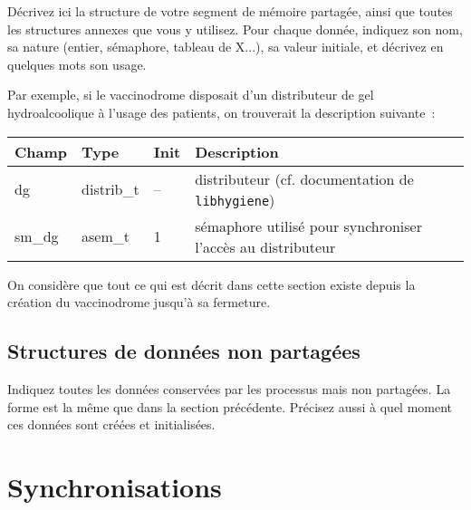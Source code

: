 \documentclass[a4paper]{article}
\makeatletter
\newenvironment{expl}{%
  \begin{list}{}{%
      \small\itshape%
      \topsep\z@%
      \listparindent0pt%
      \parsep0.75\baselineskip%
      \setlength{\leftmargin}{20mm}%
      \setlength{\rightmargin}{20mm}%
    }
  \item[]}%
  {\end{list}}
\makeatother
\begin{document}
\begin{expl}
  Décrivez ici la structure de votre segment de mémoire partagée,
  ainsi que toutes les structures annexes que vous y utilisez. Pour
  chaque donnée, indiquez son nom, sa nature (entier, sémaphore,
  tableau de X...), sa valeur initiale, et décrivez en quelques
  mots son usage.

  Par exemple, si le vaccinodrome disposait d'un distributeur de gel
  hydroalcoolique à l'usage des patients, on trouverait la description
  suivante~:

  \begin{tabularx}{\linewidth}{|l|l|l|X|}
    \hline
    Champ & Type & Init & Description \\ \hline%
    dg & distrib\_t & -- & distributeur (cf. documentation de
    \texttt{libhygiene}) \\ \hline%
    sm\_dg & asem\_t & 1 & sémaphore utilisé pour synchroniser l'accès
    au distributeur \\ \hline%
  \end{tabularx}

  On considère que tout ce qui est décrit dans cette section existe
  depuis la création du vaccinodrome jusqu'à sa fermeture.
\end{expl}

\subsection{Structures de données non partagées}

\begin{expl}
  Indiquez toutes les données conservées par les processus mais non
  partagées. La forme est la même que dans la section précédente.
  Précisez aussi à quel moment ces données sont créées et
  initialisées.
\end{expl}

\section{Synchronisations}
\end{document}
